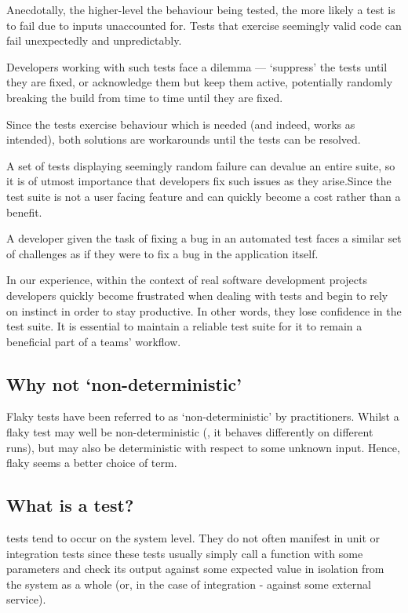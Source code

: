 Anecdotally, the higher-level the behaviour being tested, the more likely a test is to fail due to inputs unaccounted for. Tests that exercise seemingly valid code can fail unexpectedly and unpredictably.

Developers working with such tests face a dilemma --- {\lq}suppress{\rq} the tests until they are fixed, or acknowledge them but keep them active, potentially randomly breaking the build from time to time until they are fixed.

Since the tests exercise behaviour which is needed (and indeed, works as intended), both solutions are workarounds until the tests can be resolved.

A set of tests displaying seemingly random failure can devalue an entire suite, so it is of utmost importance that developers fix such issues as they arise.Since the test suite is not a user facing feature and can quickly become a cost rather than a benefit.

A developer given the task of fixing a bug in an automated test faces a similar set of challenges as if they were to fix a bug in the application itself.

In our experience, within the context of real software development projects developers quickly become frustrated when dealing with \flaky tests and begin to rely on instinct in order to stay productive. In other words, they lose confidence in the test suite. It is essential to maintain a reliable test suite for it to remain a beneficial part of a teams' workflow.


\subsection{Why not {\lq}non-deterministic{\rq}}

Flaky tests have been referred to as {\lq}non-deterministic{\rq} by practitioners. Whilst a flaky test may well be non-deterministic (\ie, it behaves differently on different runs), but may also be deterministic with respect to some unknown input. Hence, flaky seems a better choice of term.


\subsection{What is a \flaky test?}

\flaky tests tend to occur on the system level. They do not often manifest in unit or integration tests since these tests usually simply call a function with some parameters and check its output against some expected value in isolation from the system as a whole (or, in the case of integration - against some external service).

